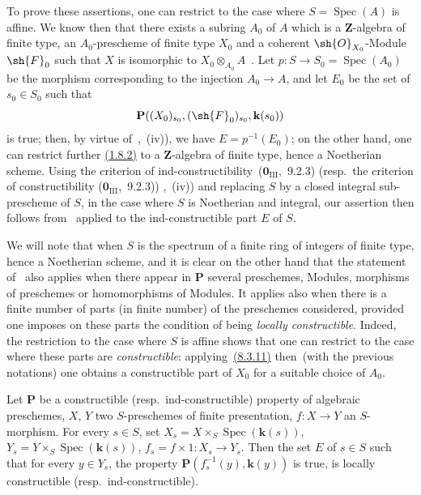 To prove these assertions, one can restrict to the case where $S=\operatorname{Spec}(A)$ is affine.
We know then that there exists a subring $A_0$ of $A$ which is a $\mathbf{Z}$-algebra of finite type, an $A_0$-prescheme of finite type $X_0$ and a coherent $\sh{O}_{X_0}$-Module $\sh{F}_0$ such that $X$ is isomorphic to $X_0\otimes_{A_0}A$~.
Let $p:S\to S_0=\operatorname{Spec}(A_0)$ be the morphism corresponding to the injection $A_0\to A$, and let $E_0$ be the set of $s_0\in S_0$ such that
\[
  \mathbf{P}((X_0)_{s_0},(\sh{F}_0)_{s_0},\mathbf{k}(s_0))
\]
is true; then, by virtue of~,~(iv)), we have $E=p^{-1}(E_0)$; on the other hand, one can restrict further {\hyperlink{ega4.c04.prop.1-8-2}{(1.8.2)}} to a $\mathbf{Z}$-algebra of finite type, hence a Noetherian scheme.
Using the criterion of ind-constructibility~($\mathbf{0}_{\mathrm{III}}$,~9.2.3) (resp.\ the criterion of constructibility ($\mathbf{0}_{\mathrm{III}}$,~9.2.3))
,~(iv)) and replacing $S$ by a closed integral sub-prescheme of $S$, in the case where $S$ is Noetherian and integral, our assertion then follows from~ applied to the ind-constructible part $E$ of $S$.

We will note that when $S$ is the spectrum of a finite ring of integers of finite type, hence a Noetherian scheme, and it is clear on the other hand that the statement of~ also applies when there appear in $\mathbf{P}$ several preschemes, Modules, morphisms of preschemes or homomorphisms of Modules.
It applies also when there is a finite number of parts (in finite number) of the preschemes considered, provided one imposes on these parts the condition of being \emph{locally constructible}.
Indeed, the restriction to the case where $S$ is affine shows that one can restrict to the case where these parts are \emph{constructible}: applying~{\hyperlink{ega4.c04.thm.8-3-11}{(8.3.11)}} then~(with the previous notations) one obtains a constructible part of $X_0$ for a suitable choice of $A_0$.

\begin{corollary}[9.2.4]
\label{IV.9.2.4}
Let $\mathbf{P}$ be a constructible \textnormal{(}resp.\ ind-constructible\textnormal{)} property of algebraic preschemes, $X$, $Y$ two $S$-preschemes of finite presentation, $f:X\to Y$ an $S$-morphism.
For every $s\in S$, set $X_s=X\times_S\operatorname{Spec}(\mathbf{k}(s))$, $Y_s=Y\times_S\operatorname{Spec}(\mathbf{k}(s))$, $f_s=f\times 1:X_s\to Y_s$.
Then the set $E$ of $s\in S$ such that for every $y\in Y_s$, the property $\mathbf{P}(f_s^{-1}(y),\mathbf{k}(y))$ is true, is locally constructible \textnormal{(}resp.\ ind-constructible\textnormal{)}.
\end{corollary}

